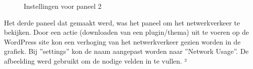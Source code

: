 \begin{figure}
    \centering
    \caption{Instellingen voor paneel 2}
\end{figure}

\clearpage
Het derde paneel dat gemaakt werd, was het paneel om het netwerkverkeer te bekijken. Door een actie (downloaden van een plugin/thema) uit te voeren op de WordPress site kon een verhoging van het netwerkverkeer gezien worden in de grafiek. Bij ''settings'' kon de naam aangepast worden naar ''Network Usage''. De afbeelding werd gebruikt om de nodige velden in te vullen. ²

